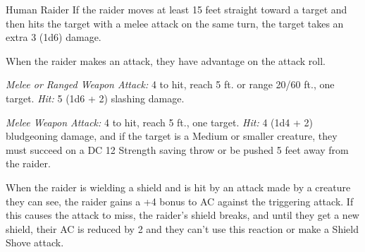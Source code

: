 \documentclass[10pt,a4paper,twoside,bg=print,twocolumn,openany,nodeprecatedcode]{dndbook}
\begin{document}
\begin{DndMonster}[float=t]{Human Raider}
\DndMonsterBasics[
armor-class = {14 (padded armor) (12 without shield)},
hit-points = {\DndDice{4d8 + 4}},
speed = {30 ft.}
]
\DndMonsterAbilityScores[
 str = 15,
 dex = 12,
 con = 12,
 int = 10,
 wis = 12,
 cha = 10
]
\DndMonsterDetails[
skills = {Stealth +3},
languages = {Common},
challenge = 1/2,
]
If the raider moves at least 15 feet straight toward a target and then hits the target with a melee attack on the same turn, the target takes an extra 3 (1d6) damage.

When the raider makes an attack, they have advantage on the attack roll.

\textsl{Melee or Ranged Weapon Attack:} 4 to hit, reach 5 ft. or range 20/60 ft., one target. \textsl{Hit:} 5 (1d6 + 2) slashing damage.

\textsl{Melee Weapon Attack:} 4 to hit, reach 5 ft., one target. \textsl{Hit:} 4 (1d4 + 2) bludgeoning damage, and if the target is a Medium or smaller creature, they must succeed on a DC 12 Strength saving throw or be pushed 5 feet away from the raider.

When the raider is wielding a shield and is hit by an attack made by a creature they can see, the raider gains a +4 bonus to AC against the triggering attack. If this causes the attack to miss, the raider's shield breaks, and until they get a new shield, their AC is reduced by 2 and they can't use this reaction or make a Shield Shove attack.

\end{DndMonster}
\end{document}
